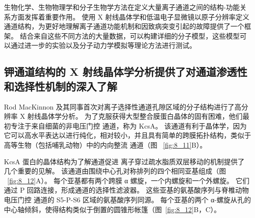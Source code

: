 生物化学、生物物理学和分子生物学方法在定义大量离子通道之间的结构-功能关系方面发挥着重要作用。
使用 X 射线晶体学和低温电子显微镜以原子分辨率定义通道结构，为更好地理解离子通道功能机制和因致病突变引起的故障提供了一个框架。
结合来自这些不同方法的大量数据，可以构建详细的分子模型，这些模型可以通过进一步的实验以及分子动力学模拟等理论方法进行测试。





\subsection{钾通道结构的 X 射线晶体学分析提供了对通道渗透性和选择性机制的深入了解}

Rod MacKinnon 及其同事首次对离子选择性通道孔隙区域的分子结构进行了高分辨率 X 射线晶体学分析。
为了克服获得大型整合膜蛋白晶体的固有困难，他们最初专注于来自细菌的非电压门控  通道，称为 KcsA。 
该通道有利于晶体学，因为它可以高水平表达以进行纯化，相对较小，并且具有简单的跨膜拓扑结构，类似于高等生物（包括哺乳动物）中的内向整流  通道（图 ~\ref{fig:8_11}B）。


KcsA 蛋白的晶体结构为了解通道促进  离子穿过疏水脂质双层移动的机制提供了几个重要的见解。
该通道由围绕中心孔对称排列的四个相同亚基组成（图 ~\ref{fig:8_12}A）。
每个亚基都有两个跨膜 α 螺旋，一个内螺旋和一个外螺旋。
它们通过 P 回路连接，形成通道的选择性滤波器。
这些亚基的氨基酸序列与脊椎动物电压门控  通道的 S5-P-S6 区域的氨基酸序列同源。
每个亚基的两个 α-螺旋从孔的中心轴倾斜，使得结构类似于倒置的圆锥形帐篷（图~\ref{fig:8_12}B，C）。


